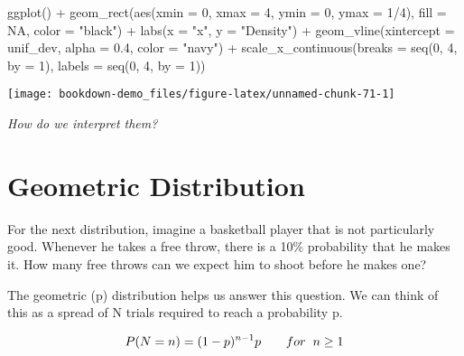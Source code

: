 \documentclass[
]{book}
\newenvironment{Shaded}{\begin{snugshade}}{\end{snugshade}}
\newcommand{\AttributeTok}[1]{\textcolor[rgb]{0.77,0.63,0.00}{#1}}
\newcommand{\ConstantTok}[1]{\textcolor[rgb]{0.00,0.00,0.00}{#1}}
\newcommand{\DecValTok}[1]{\textcolor[rgb]{0.00,0.00,0.81}{#1}}
\newcommand{\FloatTok}[1]{\textcolor[rgb]{0.00,0.00,0.81}{#1}}
\newcommand{\FunctionTok}[1]{\textcolor[rgb]{0.00,0.00,0.00}{#1}}
\newcommand{\NormalTok}[1]{#1}
\newcommand{\SpecialCharTok}[1]{\textcolor[rgb]{0.00,0.00,0.00}{#1}}
\newcommand{\StringTok}[1]{\textcolor[rgb]{0.31,0.60,0.02}{#1}}
\begin{document}
\begin{Shaded}
\begin{Highlighting}[]
\FunctionTok{ggplot}\NormalTok{() }\SpecialCharTok{+}
  \FunctionTok{geom\_rect}\NormalTok{(}\FunctionTok{aes}\NormalTok{(}\AttributeTok{xmin =} \DecValTok{0}\NormalTok{, }\AttributeTok{xmax =} \DecValTok{4}\NormalTok{, }\AttributeTok{ymin =} \DecValTok{0}\NormalTok{, }\AttributeTok{ymax =} \DecValTok{1}\SpecialCharTok{/}\DecValTok{4}\NormalTok{), }
            \AttributeTok{fill =} \ConstantTok{NA}\NormalTok{,}
            \AttributeTok{color =} \StringTok{"black"}\NormalTok{) }\SpecialCharTok{+}
  \FunctionTok{labs}\NormalTok{(}\AttributeTok{x =} \StringTok{"x"}\NormalTok{, }\AttributeTok{y =} \StringTok{"Density"}\NormalTok{) }\SpecialCharTok{+}
  \FunctionTok{geom\_vline}\NormalTok{(}\AttributeTok{xintercept =}\NormalTok{ unif\_dev, }\AttributeTok{alpha =} \FloatTok{0.4}\NormalTok{, }\AttributeTok{color =} \StringTok{"navy"}\NormalTok{) }\SpecialCharTok{+}
  \FunctionTok{scale\_x\_continuous}\NormalTok{(}\AttributeTok{breaks =} \FunctionTok{seq}\NormalTok{(}\DecValTok{0}\NormalTok{, }\DecValTok{4}\NormalTok{, }\AttributeTok{by =} \DecValTok{1}\NormalTok{), }\AttributeTok{labels =} \FunctionTok{seq}\NormalTok{(}\DecValTok{0}\NormalTok{, }\DecValTok{4}\NormalTok{, }\AttributeTok{by =} \DecValTok{1}\NormalTok{))}
\end{Highlighting}
\end{Shaded}

\begin{center}\texttt{[image: bookdown-demo\_files/figure-latex/unnamed-chunk-71-1]} \end{center}

\emph{How do we interpret them?}

\hypertarget{geometric-distribution}{%
\section{Geometric Distribution}\label{geometric-distribution}}

For the next distribution, imagine a basketball player that is not particularly good. Whenever he takes a free throw, there is a 10\% probability that he makes it. How many free throws can we expect him to shoot before he makes one?

The geometric (p) distribution helps us answer this question. We can think of this as a spread of N trials required to reach a probability p.

\[P(N = n) = (1-p)^{n-1} p \hspace{0.7cm}for\hspace{0.2cm} n\geq1\]
\end{document}

